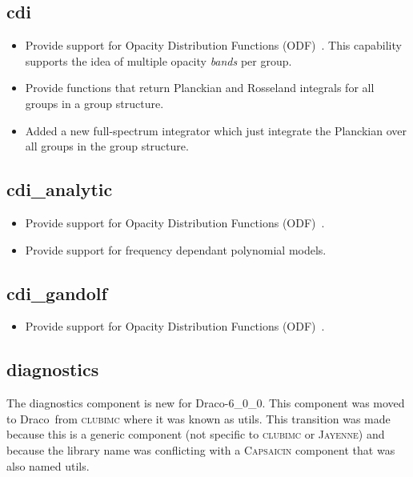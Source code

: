 \documentclass[note]{ResearchNote}
\newcommand{\draco}{Draco}
\newcommand{\dracor}{\draco-6\_0\_0}
\begin{document}
\subsection{cdi}
\label{changes:cdi}
\begin{itemize}
\item Provide support for Opacity Distribution Functions
  (ODF)~\cite{ccs2:08-52}. This capability supports the idea of
  multiple opacity {\it bands} per group.  
\item Provide functions that return Planckian and Rosseland integrals
  for all groups in a group structure.
\item Added a new full-spectrum integrator which just integrate the
  Planckian over all groups in the group structure.
\end{itemize}

\subsection{cdi\_analytic}
\label{changes:cdi-analytic}
\begin{itemize}
\item Provide support for Opacity Distribution Functions
  (ODF)~\cite{ccs2:08-52}.  
\item Provide support for frequency dependant polynomial models.
\end{itemize}

\subsection{cdi\_gandolf}
\label{changes:cdi-gandolf}
\begin{itemize}
\item Provide support for Opacity Distribution Functions
  (ODF)~\cite{ccs2:08-52,gandolf}.
\end{itemize}

\subsection{diagnostics}
\label{changes:diagnostics}
The \textsf{diagnostics} component is new for \dracor.  This component
was moved to \draco\ from \textsc{clubimc} where it was known as
\textsf{utils}.  This transition was made because this is a generic
component (not specific to \textsc{clubimc} or \textsc{Jayenne}) and
because the library name was conflicting with a \textsc{Capsaicin}
component that was also named \textsf{utils}.
\end{document}
